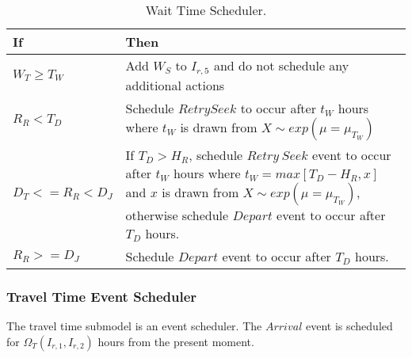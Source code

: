 \documentclass[journal]{IEEEtran}
\begin{document}
\begin{table}[!h]
\def\colmarginA{2.5cm}
\def\colmarginB{5.5cm}
\renewcommand{\arraystretch}{1.3}
\caption{Wait Time Scheduler.}
\label{tab:waitTime}
\centering
\begin{tabular}{|ll|}
\hline
\textbf{If} & \textbf{Then} \\
\hline
\parbox[t]{\colmarginA}{ \raggedright  
    $W_T \ge T_W$
  }  & \parbox[t]{\colmarginB}{ \raggedright 
    Add $W_S$ to $I_{r,5}$ and do not schedule any additional actions
} \\
\parbox[t]{\colmarginA}{ \raggedright  
    $R_R < T_D$
  }  & \parbox[t]{\colmarginB}{ \raggedright 
    Schedule $Retry Seek$ to occur after $t_W$ hours where $t_W$ is drawn from $X \sim exp(\mu = \mu_{T_W})$\\
} \\
\parbox[t]{\colmarginA}{ \raggedright  
  $D_T <= R_R < D_J$
  }  & \parbox[t]{\colmarginB}{ \raggedright 
If $T_D > H_R$, schedule $Retry ~Seek$ event to occur after $t_W$ hours where $t_W = max[T_D - H_R, x]$ and $x$ is drawn from $X \sim exp(\mu = \mu_{T_W})$, otherwise schedule $Depart$ event to occur after $T_D$ hours.
} \\
\parbox[t]{\colmarginA}{ \raggedright  
  $R_R >= D_J$
  }  & \parbox[t]{\colmarginB}{ \raggedright 
  Schedule $Depart$ event to occur after $T_D$ hours.
} \\
\hline
\end{tabular}
\end{table}

\subsubsection{Travel Time Event Scheduler}\label{travelSched}

The travel time submodel is an event scheduler.  The $Arrival$ event is scheduled for $\Omega_T(I_{r,1},I_{r,2})$ hours from the present moment. 
\end{document}
